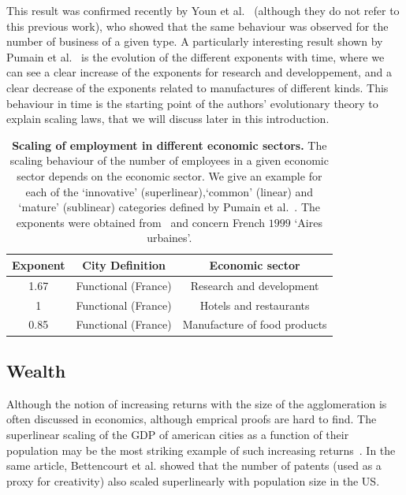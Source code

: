 This result was confirmed recently by Youn et al.~\cite{Youn:2014} (although
they do not refer to this previous work), who showed that the same behaviour was
observed for the number of business of a given type. A particularly interesting
result shown by Pumain et al.~\cite{Pumain:2006} is the evolution of the
different exponents with time, where we can see a clear increase of the
exponents for research and developpement, and a clear decrease of the exponents
related to manufactures of different kinds. This behaviour in time is the
starting point of the authors' evolutionary theory to explain scaling laws, that
we will discuss later in this introduction.\\

\begin{table}[!h]
    \centering
\begin{tabular}{|ccc|}
\hline
Exponent & City Definition & Economic sector\\
\hline
1.67 & Functional (France) & Research and development\\
1 & Functional (France) & Hotels and restaurants \\
0.85 & Functional (France) & Manufacture of food products\\
\hline
\end{tabular}
\caption{{\bf Scaling of employment in different economic sectors.} The scaling
behaviour of the number of employees in a given economic sector depends on the
economic sector. We give an example for each of the `innovative'
(superlinear),`common' (linear) and `mature' (sublinear) categories defined by
Pumain et al.~\cite{Pumain:2006}. The exponents were obtained from~\cite{Pumain:2006} and concern
French $1999$ `Aires urbaines'.} 
\label{table:employment} 
\end{table}

\subsection{Wealth}
\label{sub:wealth}

Although the notion of increasing returns with the size of the agglomeration is
often discussed in economics, although emprical proofs are hard to find. The
superlinear scaling of the GDP of american cities as a function of their
population may be the most striking example of such increasing
returns~\cite{Bettencourt:2007}. In the same article, Bettencourt et al. showed
that the number of patents (used as a proxy for creativity) also scaled
superlinearly with population size in the US.

